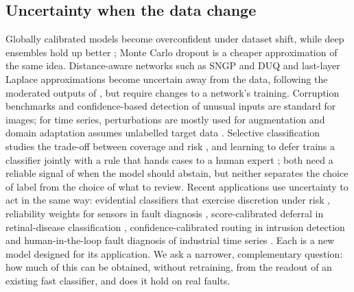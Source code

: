 \documentclass[preprint,12pt,authoryear]{elsarticle}
\begin{document}
\subsection{Uncertainty when the data change}
Globally calibrated models become overconfident under dataset shift, while deep ensembles hold up better \citep{lakshminarayanan2017,ovadia2019}; Monte Carlo dropout \citep{gal2016dropout} is a cheaper approximation of the same idea. Distance-aware networks such as SNGP \citep{liu2020sngp,liu2023sngp} and DUQ \citep{vanamersfoort2020} and last-layer Laplace approximations \citep{kristiadi2020} become uncertain away from the data, following the moderated outputs of \citet{mackay1992}, but require changes to a network's training. Corruption benchmarks \citep{hendrycks2019} and confidence-based detection of unusual inputs \citep{hendrycks2017} are standard for images; for time series, perturbations are mostly used for augmentation \citep{iwana2021,um2017} and domain adaptation assumes unlabelled target data \citep{ragab2023}. Selective classification studies the trade-off between coverage and risk \citep{geifman2017}, and learning to defer trains a classifier jointly with a rule that hands cases to a human expert \citep{madras2018,mozannar2020}; both need a reliable signal of when the model should abstain, but neither separates the choice of label from the choice of what to review. Recent applications use uncertainty to act in the same way: evidential classifiers that exercise discretion under risk \citep{sensoy2025risk}, reliability weights for sensors in fault diagnosis \citep{han2025evidential}, score-calibrated deferral in retinal-disease classification \citep{kinalioglu2027mmap}, confidence-calibrated routing in intrusion detection \citep{munir2027ccaid} and human-in-the-loop fault diagnosis of industrial time series \citep{zhang2025llmtsfd}. Each is a new model designed for its application. We ask a narrower, complementary question: how much of this can be obtained, without retraining, from the readout of an existing fast classifier, and does it hold on real faults.
\end{document}
